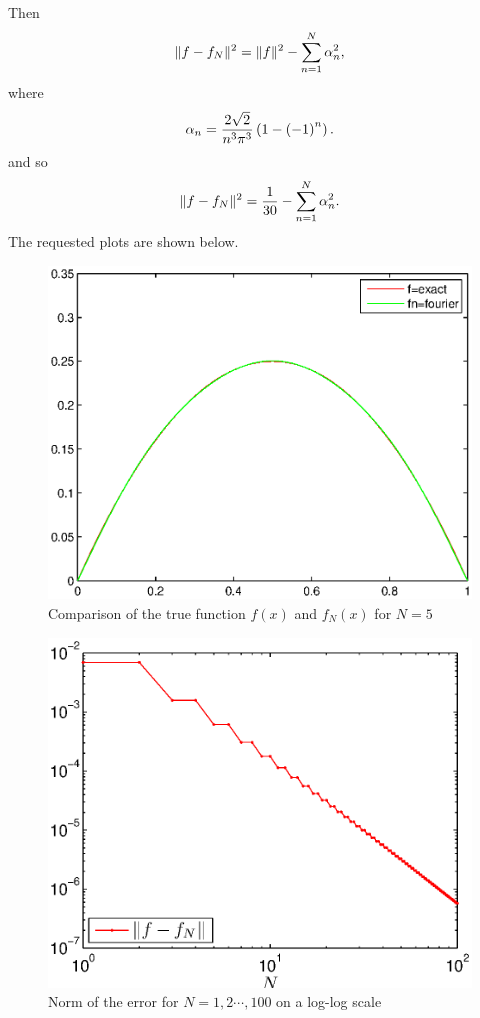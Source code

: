 \begin{solution}
\begin{enumerate}
\[\]
Then
\[
\|f-f_N\|^2 = \|f\|^2 - \sum_{n=1}^N \alpha_n^2,
\]
where
\[
\alpha_n={2 \sqrt{2} \over n^3 \pi^3} \left(1-\left(-1\right)^n\right).
\]
and so
\[
\|f-f_N\|^2 = \frac{1}{30} - \sum_{n=1}^N \alpha_n^2.
\]
The requested plots are shown below. 
\begin{figure}
\centering
\includegraphics[scale=0.9]{ffn}
\vspace{-.5cm}
\caption{Comparison of the true function $f(x)$ and $f_N(x)$ for $N = 5$}
\end{figure}

\begin{figure}
\centering
\includegraphics[scale=0.9]{ffnnorm}
\vspace{-.4cm}
\caption{Norm of the error for $N=1,2 \cdots,100$ on a log-log scale}
\end{figure}


\end{enumerate}
\end{solution}
